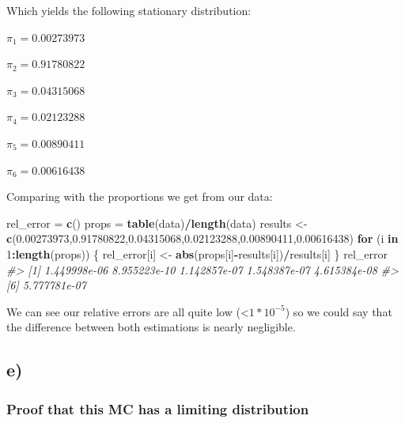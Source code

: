 \documentclass[]{article}
\newenvironment{Shaded}{\begin{snugshade}}{\end{snugshade}}
\newcommand{\CommentTok}[1]{\textcolor[rgb]{0.56,0.35,0.01}{\textit{#1}}}
\newcommand{\ControlFlowTok}[1]{\textcolor[rgb]{0.13,0.29,0.53}{\textbf{#1}}}
\newcommand{\DecValTok}[1]{\textcolor[rgb]{0.00,0.00,0.81}{#1}}
\newcommand{\FloatTok}[1]{\textcolor[rgb]{0.00,0.00,0.81}{#1}}
\newcommand{\KeywordTok}[1]{\textcolor[rgb]{0.13,0.29,0.53}{\textbf{#1}}}
\newcommand{\NormalTok}[1]{#1}
\newcommand{\OperatorTok}[1]{\textcolor[rgb]{0.81,0.36,0.00}{\textbf{#1}}}
\newcommand{\StringTok}[1]{\textcolor[rgb]{0.31,0.60,0.02}{#1}}
\begin{document}
Which yields the following stationary distribution:

\(\pi_{1} = 0.00273973\)

\(\pi_{2} = 0.91780822\)

\(\pi_{3} = 0.04315068\)

\(\pi_{4} = 0.02123288\)

\(\pi_{5} = 0.00890411\)

\(\pi_{6} = 0.00616438\)

\newpage

Comparing with the proportions we get from our data:

\begin{Shaded}
\begin{Highlighting}[]
\NormalTok{rel_error =}\StringTok{ }\KeywordTok{c}\NormalTok{()}
\NormalTok{props =}\StringTok{ }\KeywordTok{table}\NormalTok{(data)}\OperatorTok{/}\KeywordTok{length}\NormalTok{(data)}
\NormalTok{results <-}\StringTok{ }\KeywordTok{c}\NormalTok{(}\FloatTok{0.00273973}\NormalTok{,}\FloatTok{0.91780822}\NormalTok{,}\FloatTok{0.04315068}\NormalTok{,}\FloatTok{0.02123288}\NormalTok{,}\FloatTok{0.00890411}\NormalTok{,}\FloatTok{0.00616438}\NormalTok{)}
\ControlFlowTok{for}\NormalTok{ (i }\ControlFlowTok{in} \DecValTok{1}\OperatorTok{:}\KeywordTok{length}\NormalTok{(props)) \{}
\NormalTok{    rel_error[i] <-}\StringTok{ }\KeywordTok{abs}\NormalTok{(props[i]}\OperatorTok{-}\NormalTok{results[i])}\OperatorTok{/}\NormalTok{results[i]}
\NormalTok{\}}
\NormalTok{rel_error}
\CommentTok{#> [1] 1.449998e-06 8.955223e-10 1.142857e-07 1.548387e-07 4.615384e-08}
\CommentTok{#> [6] 5.777781e-07}
\end{Highlighting}
\end{Shaded}

We can see our relative errors are all quite low
(\textless{}\(1*10^{-5}\)) so we could say that the difference between
both estimations is nearly negligible.

\hypertarget{e}{%
\subsection{e)}\label{e}}

\hypertarget{proof-that-this-mc-has-a-limiting-distribution}{%
\subsubsection{Proof that this MC has a limiting
distribution}\label{proof-that-this-mc-has-a-limiting-distribution}}
\end{document}
